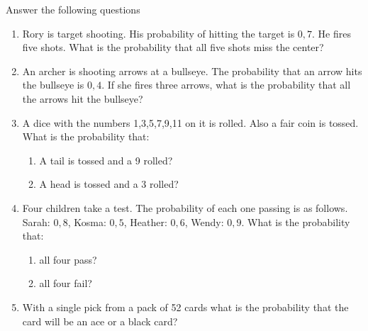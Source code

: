       \label{m39377*id114484}Answer the following questions \par 
      \label{m39377*id114495}\begin{enumerate}[noitemsep, label=\textbf{\arabic*}. ] 
            \label{m39377*uid60}\item Rory is target shooting. His probability of hitting the target is
\begin{math}0,7\end{math}. He fires five shots. What is the probability
that all five shots miss the center?\newline
            \label{m39377*uid63}\item An archer is shooting arrows at a bullseye. The
probability that an arrow hits the bullseye is
\begin{math}0,4\end{math}. If she fires three arrows, what is the
probability that all the arrows hit the bullseye?\newline
            \label{m39377*uid66}\item A dice with the numbers 1,3,5,7,9,11 on it is rolled.
Also a fair coin is tossed. What is the probability that:
\label{m39377*id114596}\begin{enumerate}[noitemsep, label=\textbf{\alph*}. ] 
            \label{m39377*uid69}\item A tail is tossed and a 9 rolled?
\label{m39377*uid70}\item A head is tossed and a 3 rolled?
\end{enumerate}
                \label{m39377*uid71}\item Four children take a test. The probability of each one
passing is as follows. Sarah: \begin{math}0,8\end{math}, Kosma:
\begin{math}0,5\end{math}, Heather: \begin{math}0,6\end{math},
Wendy: \begin{math}0,9\end{math}. What is the probability that:
\label{m39377*id114667}\begin{enumerate}[noitemsep, label=\textbf{\alph*}. ] 
            \label{m39377*uid72}\item all four pass?
\label{m39377*uid73}\item all four fail?
\end{enumerate}
                \label{m39377*uid75}\item With a single pick from a pack of 52 cards what is the
probability that the card will be an ace or a black card?\newline
            
\end{enumerate}
        
